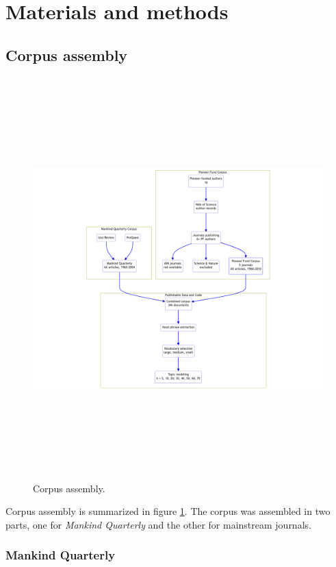 \documentclass[12pt]{article}
\begin{document}
\hypertarget{materials-and-methods}{%
\section{Materials and methods}\label{materials-and-methods}}

\hypertarget{corpus-assembly}{%
\subsection{Corpus assembly}\label{corpus-assembly}}

\begin{figure}
\centering
\includegraphics[width=8in,height=6.1in]{img/dataset.png}
\caption{Corpus assembly. \label{fig:corpus}}
\end{figure}

Corpus assembly is summarized in figure \ref{fig:corpus}. The corpus was assembled in two parts, one for \emph{Mankind Quarterly} and the other for mainstream journals.

\hypertarget{mankind-quarterly}{%
\subsubsection{Mankind Quarterly}\label{mankind-quarterly}}
\end{document}
